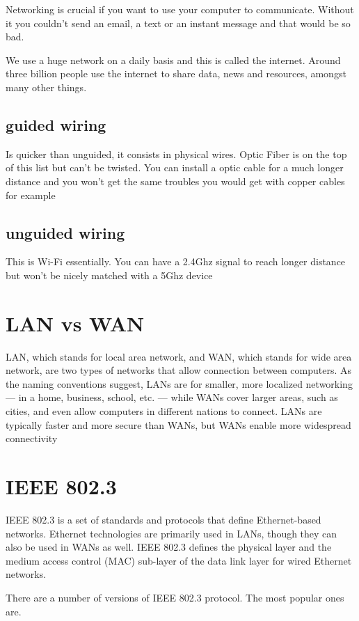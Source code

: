 \documentclass[a4paper,12pt]{article}
\begin{document}
Networking is crucial if you want to use your computer to communicate. Without it you couldn’t send an email, a text or an instant message and that would be so bad.

We use a huge network on a daily basis and this is called the internet. Around three billion people use the internet to share data, news and resources, amongst many other things.
\subsection{guided wiring}
Is quicker than unguided, it consists in physical wires. Optic Fiber is on the top of this list but can't be twisted. You can install a optic cable for a much longer distance and you won't get the same troubles you would get with copper cables for example

\subsection{unguided wiring}
This is Wi-Fi essentially. You can have a 2.4Ghz signal to reach longer distance but won't be nicely matched with a 5Ghz device

\section{LAN vs WAN}

LAN, which stands for local area network, and WAN, which stands for wide area network, are two types of networks that allow connection between computers. As the naming conventions suggest, LANs are for smaller, more localized networking — in a home, business, school, etc. — while WANs cover larger areas, such as cities, and even allow computers in different nations to connect. LANs are typically faster and more secure than WANs, but WANs enable more widespread connectivity

\clearpage

\section{IEEE 802.3}

IEEE 802.3 is a set of standards and protocols that define Ethernet-based networks. Ethernet technologies are primarily used in LANs, though they can also be used in WANs as well. IEEE 802.3 defines the physical layer and the medium access control (MAC) sub-layer of the data link layer for wired Ethernet networks.

There are a number of versions of IEEE 802.3 protocol. The most popular ones are.
\end{document}
